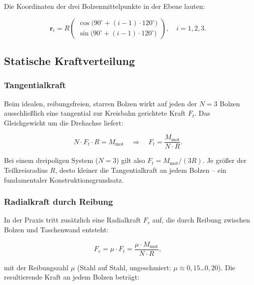 ﻿\documentclass[a4paper,12pt]{article}
\begin{document}
Die Koordinaten der drei Bolzenmittelpunkte in der Ebene lauten:

\begin{equation}
  \mathbf{r}_i = R \begin{pmatrix} \cos\bigl(90^\circ + (i-1)\cdot 120^\circ\bigr) \\
    \sin\bigl(90^\circ + (i-1)\cdot 120^\circ\bigr) \end{pmatrix},
  \quad i = 1, 2, 3.
  \label{eq:bolzenpos}
\end{equation}

\subsection{Statische Kraftverteilung}

\subsubsection*{Tangentialkraft}

Beim idealen, reibungsfreien, starren Bolzen wirkt auf jeden der $N = 3$
Bolzen ausschließlich eine tangential zur Kreisbahn gerichtete Kraft $F_t$.
Das Gleichgewicht um die Drehachse liefert:

\begin{equation}
  N \cdot F_t \cdot R = M_\text{mot}
  \quad\Longrightarrow\quad
  \boxed{F_t = \frac{M_\text{mot}}{N \cdot R}.}
  \label{eq:Ft}
\end{equation}

Bei einem dreipoligen System ($N = 3$) gilt also $F_t = M_\text{mot} / (3R)$.
Je größer der Teilkreisradius $R$, desto kleiner die Tangentialkraft an
jedem Bolzen -- ein fundamentaler Konstruktionsgrundsatz.

\subsubsection*{Radialkraft durch Reibung}

In der Praxis tritt zusätzlich eine Radialkraft $F_r$ auf, die durch
Reibung zwischen Bolzen und Taschenwand entsteht:

\begin{equation}
  F_r = \mu \cdot F_t = \frac{\mu \cdot M_\text{mot}}{N \cdot R},
  \label{eq:Fr}
\end{equation}

\noindent
mit der Reibungszahl $\mu$ (Stahl auf Stahl, ungeschmiert:
$\mu \approx 0{,}15$\ldots$0{,}20$). Die resultierende Kraft an jedem
Bolzen beträgt:
\end{document}
